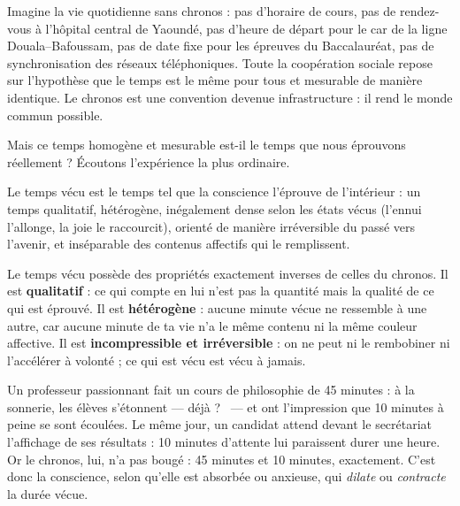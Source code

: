 \documentclass[11pt]{article}
\newcommand{\cle}[1]{{\popxbold\color{popdark}#1}}
\newcounter{popsec}
\newcounter{popsub}
\newcommand{\courssub}[1]{%
  \stepcounter{popsub}%
  \par\vspace{9pt}\noindent{\popxbold\fontsize{11.5}{13}\selectfont\color{popink}{\color{poporange}\thepopsec.\thepopsub}\hspace{6pt}#1}\par\nopagebreak\vspace{4pt}
}
\begin{document}
\begin{exemplebox}
Imagine la vie quotidienne sans chronos : pas d'horaire de cours, pas de rendez-vous à l'hôpital central de Yaoundé, pas d'heure de départ pour le car de la ligne Douala--Bafoussam, pas de date fixe pour les épreuves du Baccalauréat, pas de synchronisation des réseaux téléphoniques. Toute la coopération sociale repose sur l'hypothèse que le temps est le même pour tous et mesurable de manière identique. Le chronos est une convention devenue infrastructure : il rend le monde commun possible.
\end{exemplebox}

\courssub{Le temps vécu : le temps de la conscience}

Mais ce temps homogène et mesurable est-il le temps que nous éprouvons réellement ? Écoutons l'expérience la plus ordinaire.

\begin{definition}
Le \cle{temps vécu} est le temps tel que la conscience l'éprouve de l'intérieur : un temps qualitatif, hétérogène, inégalement dense selon les états vécus (l'ennui l'allonge, la joie le raccourcit), orienté de manière irréversible du passé vers l'avenir, et inséparable des contenus affectifs qui le remplissent.
\end{definition}

Le temps vécu possède des propriétés exactement inverses de celles du chronos. Il est \textbf{qualitatif} : ce qui compte en lui n'est pas la quantité mais la qualité de ce qui est éprouvé. Il est \textbf{hétérogène} : aucune minute vécue ne ressemble à une autre, car aucune minute de ta vie n'a le même contenu ni la même couleur affective. Il est \textbf{incompressible et irréversible} : on ne peut ni le rembobiner ni l'accélérer à volonté ; ce qui est vécu est vécu à jamais.

\begin{exemplebox}
Un professeur passionnant fait un cours de philosophie de 45 minutes : à la sonnerie, les élèves s'étonnent --- \guillemotleft déjà ? \guillemotright\ --- et ont l'impression que 10 minutes à peine se sont écoulées. Le même jour, un candidat attend devant le secrétariat l'affichage de ses résultats : 10 minutes d'attente lui paraissent durer une heure. Or le chronos, lui, n'a pas bougé : 45 minutes et 10 minutes, exactement. C'est donc la conscience, selon qu'elle est absorbée ou anxieuse, qui \emph{dilate} ou \emph{contracte} la durée vécue.
\end{exemplebox}
\end{document}
